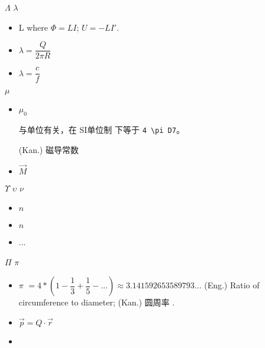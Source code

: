 $\Lambda$ $\lambda$\begin{itemize}
	\item L %
		where $\Phi=LI$; $U = -LI'$.
	\item $\lambda = \dfrac Q {2 \pi R}$ %
	\item $\lambda = \dfrac{c}{f}$%
\end{itemize}

 $\mu$\begin{itemize}
	
\item $\mu_0$

与单位有关，在 SI单位制 下等于 \verb`4 \pi D7`。

(Kan.) 磁导常数 %




\item $\vec{M}$ %
\end{itemize}

  $\Upsilon$ $\upsilon$ $\nu$\begin{itemize}
	\item $n$ %
	\item $\hat{n}$ %
\end{itemize}

\begin{itemize}
	\item ...
\end{itemize}

 $\Pi$ $\pi$ \begin{itemize}
	\item $\pi $  $= 4*(1-\dfrac{1}{3}+\dfrac{1}{5}-...) \approx 3.141592653589793...$
	(Eng.) Ratio of circumference to diameter;
	(Kan.) 圆周率 .%
	
	\item $\vec{p} = Q \cdot \vec r$ %
	\item %
\end{itemize}


